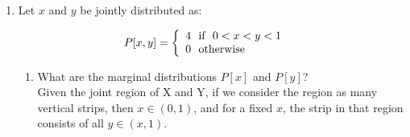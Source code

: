 \documentclass[
  12pt,
]{article}
\begin{document}
\begin{enumerate}
\item Let $x$ and $y$ be jointly distributed as:

\begin{align}
P[x,y]=  \left\{ \begin{array}{l l} 
        4 \ \text{ if } \ 0 < x < y < 1
        &\\
        0 \ \text{ otherwise }
    \end{array} \right.
\end{align}

\begin{enumerate}
\item What are the marginal distributions $P[x]$ and $P[y]$?\\
{
\color{blue}
Given the joint region of X and Y, if we consider the region as many vertical strips, then $x \in (0, 1)$, and for a fixed $x$, the strip in that region consists of all $y \in (x, 1)$.\\

}
\end{enumerate}
\end{enumerate}
\end{document}
